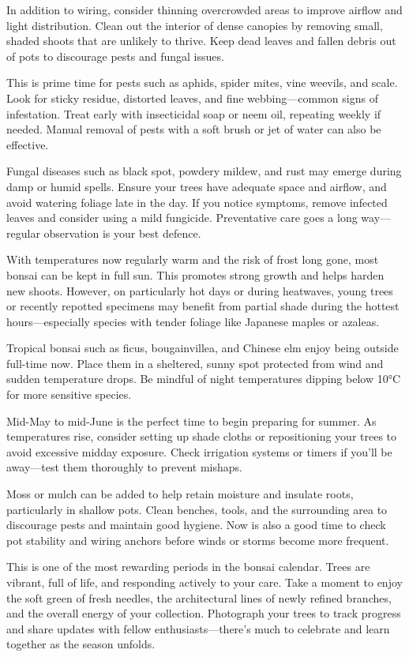 In addition to wiring, consider thinning overcrowded areas to improve airflow and light distribution.
Clean out the interior of dense canopies by removing small, shaded shoots that are unlikely to thrive.
Keep dead leaves and fallen debris out of pots to discourage pests and fungal issues.
\columnbreak

\medskip
{}
\noindent
This is prime time for pests such as aphids, spider mites, vine weevils, and scale.
Look for sticky residue, distorted leaves, and fine webbing---common signs of infestation.
Treat early with insecticidal soap or neem oil, repeating weekly if needed.
Manual removal of pests with a soft brush or jet of water can also be effective.

Fungal diseases such as black spot, powdery mildew, and rust may emerge during damp or humid spells.
Ensure your trees have adequate space and airflow, and avoid watering foliage late in the day.
If you notice symptoms, remove infected leaves and consider using a mild fungicide.
Preventative care goes a long way---regular observation is your best defence.

\medskip
{}
\noindent
With temperatures now regularly warm and the risk of frost long gone, most bonsai can be kept in full sun.
This promotes strong growth and helps harden new shoots.
However, on particularly hot days or during heatwaves, young trees or recently repotted specimens may benefit from partial shade during the hottest hours---especially species with tender foliage like Japanese maples or azaleas.

Tropical bonsai such as ficus, bougainvillea, and Chinese elm enjoy being outside full\--time now.
Place them in a sheltered, sunny spot protected from wind and sudden temperature drops.
Be mindful of night temperatures dipping below 10°C for more sensitive species.

\medskip
{}
\noindent
Mid\--May to mid\--June is the perfect time to begin preparing for summer.
As temperatures rise, consider setting up shade cloths or repositioning your trees to avoid excessive midday exposure.
Check irrigation systems or timers if you'll be away---test them thoroughly to prevent mishaps.

Moss or mulch can be added to help retain moisture and insulate roots, particularly in shallow pots.
Clean benches, tools, and the surrounding area to discourage pests and maintain good hygiene.
Now is also a good time to check pot stability and wiring anchors before winds or storms become more frequent.

\medskip
{}
\noindent
This is one of the most rewarding periods in the bonsai calendar.
Trees are vibrant, full of life, and responding actively to your care.
Take a moment to enjoy the soft green of fresh needles, the architectural lines of newly refined branches, and the overall energy of your collection.
Photograph your trees to track progress and share updates with fellow enthusiasts---there's much to celebrate and learn together as the season unfolds.
\closearticle
